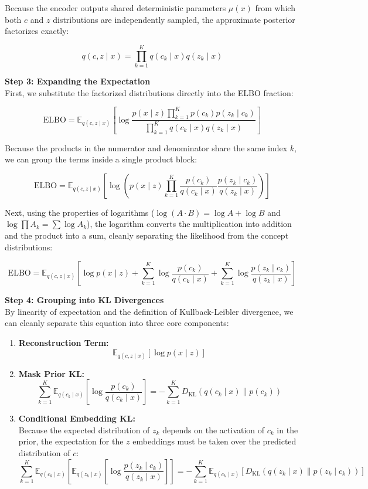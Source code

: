 \documentclass[11pt, a4paper]{article}
\begin{document}
Because the encoder outputs shared deterministic parameters $\mu(x)$ from which both $c$ and $z$ distributions are independently sampled, the approximate posterior factorizes exactly:

\[
q(c, z \mid x) = \prod_{k=1}^K q(c_k \mid x) q(z_k \mid x)
\]

\textbf{Step 3: Expanding the Expectation}\\
First, we substitute the factorized distributions directly into the ELBO fraction:

\[
\text{ELBO} = \mathbb{E}_{q(c, z \mid x)} \left[ \log \frac{p(x \mid z) \prod_{k=1}^K p(c_k) p(z_k \mid c_k)}{\prod_{k=1}^K q(c_k \mid x) q(z_k \mid x)} \right]
\]

Because the products in the numerator and denominator share the same index $k$, we can group the terms inside a single product block:

\[
\text{ELBO} = \mathbb{E}_{q(c, z \mid x)} \left[ \log \left( p(x \mid z) \prod_{k=1}^K \frac{p(c_k)}{q(c_k \mid x)} \frac{p(z_k \mid c_k)}{q(z_k \mid x)} \right) \right]
\]

Next, using the properties of logarithms ($\log(A \cdot B) = \log A + \log B$ and $\log \prod A_k = \sum \log A_k$), the logarithm converts the multiplication into addition and the product into a sum, cleanly separating the likelihood from the concept distributions:

\[
\text{ELBO} = \mathbb{E}_{q(c, z \mid x)} \left[ \log p(x \mid z) + \sum_{k=1}^K \log \frac{p(c_k)}{q(c_k \mid x)} + \sum_{k=1}^K \log \frac{p(z_k \mid c_k)}{q(z_k \mid x)} \right]
\]

\textbf{Step 4: Grouping into KL Divergences}\\
By linearity of expectation and the definition of Kullback-Leibler divergence, we can cleanly separate this equation into three core components:

\begin{enumerate}
    \item \textbf{Reconstruction Term:}
    \[
    \mathbb{E}_{q(c, z \mid x)}[\log p(x \mid z)]
    \]

    \item \textbf{Mask Prior KL:}
    \[
    \sum_{k=1}^K \mathbb{E}_{q(c_k \mid x)} \left[ \log \frac{p(c_k)}{q(c_k \mid x)} \right] = - \sum_{k=1}^K D_{\mathrm{KL}}(q(c_k \mid x) \parallel p(c_k))
    \]

    \item \textbf{Conditional Embedding KL:}\\
    Because the expected distribution of $z_k$ depends on the activation of $c_k$ in the prior, the expectation for the $z$ embeddings must be taken over the predicted distribution of $c$:
    \[
    \sum_{k=1}^K \mathbb{E}_{q(c_k \mid x)} \left[ \mathbb{E}_{q(z_k \mid x)} \left[ \log \frac{p(z_k \mid c_k)}{q(z_k \mid x)} \right] \right] = - \sum_{k=1}^K \mathbb{E}_{q(c_k \mid x)} \left[ D_{\mathrm{KL}}(q(z_k \mid x) \parallel p(z_k \mid c_k)) \right]
    \]
\end{enumerate}
\end{document}
